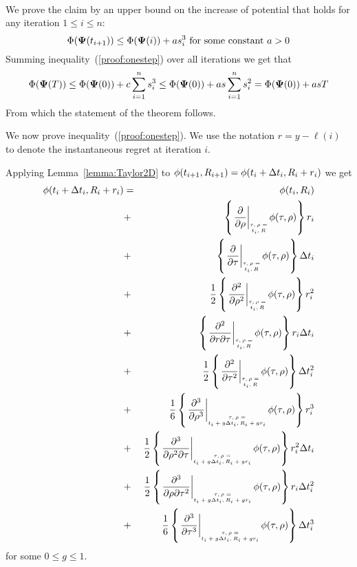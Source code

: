\documentclass{article}[12pt]
\begin{document}
{\\
We prove the claim by an upper bound on the increase of potential that holds for any iteration $1 \leq i \leq n$:
\begin{equation} \label{proof:onestep}
\Phi({\bf \Psi}(t_{i+1})) \leq \Phi({\bf \Psi}(i)) + a s_i^3 \mbox{ for some constant } a>0
\end{equation}
Summing inequality~(\ref{proof:onestep}) over all iterations we get that 
\begin{equation} \label{proof:allsteps}
\Phi({\bf \Psi}(T)) \leq \Phi({\bf \Psi}(0)) + c \sum_{i=1}^n s_i^3 \leq 
\Phi({\bf \Psi}(0)) + a s \sum_{i=1}^n s_i^2 = 
\Phi({\bf \Psi}(0)) + a s T
\end{equation}
From which the statement of the theorem follows.

We now prove inequality~(\ref{proof:onestep}). 
We use the notation $r=y -\ell(i)$ to denote the instantaneous regret at iteration $i$. 


Applying Lemma~\ref{lemma:Taylor2D} to
$\phi(t_{i+1},R_{i+1})=\phi(t_i+\Delta t_i,R_i+r_i)$  we get
\begin{eqnarray} 
    \pot(t_i+\deltat_i,\R_i+r_i) & =&  
    \pot(t_i,\R_i)\\
    &+&\at{\frac{\partial}{\partial \rho}} r_i \\
    &+&\at{\frac{\partial}{\partial \tau}}  \deltat_i \\
    &+& \frac{1}{2} \at{\frac{\partial^2}{\partial \rho^2}} r_i^2 \\
    &+& \at{\frac{\partial^2}{\partial r \partial \tau}} r_i \deltat_i \label{term:Taylor_rdt}\\
    &+& \frac{1}{2} \at{\frac{\partial^2}{\partial \tau^2}} \deltat_i^2 \label{term:Taylor_dtsquare}\\
    &+& \frac{1}{6} \att{\frac{\partial^3}{\partial \rho^3}} r_i^3 \label{term:Taylor_r3}\\
    &+& \frac{1}{2} \att{\frac{\partial^3}{\partial \rho^2 \partial \tau}} r_i^2\deltat_i \label{term:Taylor_r2t}\\
    &+& \frac{1}{2} \att{\frac{\partial^3}{\partial \rho \partial \tau^2}} r_i\deltat_i^2 \label{term:Taylor_rt2}\\
    &+& \frac{1}{6} \att{\frac{\partial^3}{\partial \tau^3}} \deltat_i^3 \label{term:Taylor_t3}
\end{eqnarray}
for some $0 \leq g \leq 1$.

}
\end{document}
